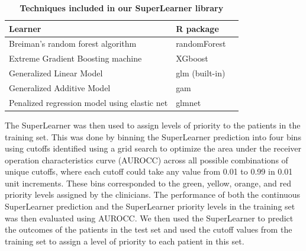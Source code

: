 \documentclass[10pt,letterpaper]{article}\usepackage[]{graphicx}\usepackage[]{color}
\begin{document}
\begin{table}[h!]
  \centering
  \caption{\bf Techniques included in our SuperLearner library}
  \label{tab:superlearner-library}
  \begin{tabular}{llr}
    \hline
    Learner                                       & R package \\
    \hline
    Breiman's random forest algorithm             & randomForest \cite{randomforest} \\
    Extreme Gradient Boosting machine             & XGboost \cite{xgboost} \\
    Generalized Linear Model                      & glm (built-in) \\
    Generalized Additive Model                    & gam       \cite{gam} \\
    Penalized regression model using elastic net  & glmnet \cite{glmnet} \\
    \hline
  \end{tabular}
\end{table}

The SuperLearner was then used to assign levels of priority to the patients in
the training set. This was done by binning the SuperLearner prediction into four
bins using cutoffs identified using a grid search to optimize the area under the
receiver operation characteristics curve (AUROCC) across all possible
combinations of unique cutoffs, where each cutoff could take any value from 0.01
to 0.99 in 0.01 unit increments. These bins corresponded to the green, yellow,
orange, and red priority levels assigned by the clinicians. The performance of
both the continuous SuperLearner prediction and the SuperLearner priority levels
in the training set was then evaluated using AUROCC. We then used the
SuperLearner to predict the outcomes of the patients in the test set and used
the cutoff values from the training set to assign a level of priority to each
patient in this set.
\end{document}
